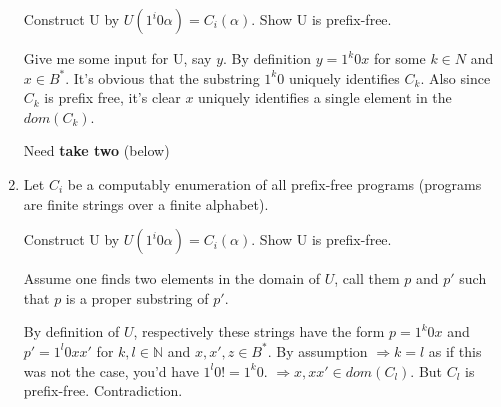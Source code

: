 \documentclass{article}
\newenvironment{answered}{\par\normalfont}{}
\begin{document}
\begin{enumerate}
	Construct U by $U(1^i0\alpha) = C_i(\alpha)$. Show U is prefix-free.

	\begin{answered}
		Give me some input for U, say $y$. By definition $y = 1^k0x$ for some $k \in N$ and $x \in B^*$. It's obvious that the substring $1^k0$ uniquely identifies $C_k$. Also since $C_k$ is prefix free, it's clear $x$ uniquely identifies a single element in the $dom(C_k)$.
	\end{answered}

	Need \textbf{take two} (below)

\item{Let $C_i$ be a computably enumeration of all prefix-free programs (programs are finite strings over a finite alphabet).}
	
	Construct U by $U(1^i0\alpha) = C_i(\alpha)$. Show U is prefix-free.

	\begin{answered}
		Assume one finds two elements in the domain of $U$, call them $p$ and $p'$ such that $p$ is a proper substring of $p'$.

		By definition of $U$, respectively these strings have the form $p = 1^k0x$ and $p' = 1^l0xx'$ for $k,l \in \mathbb{N}$ and $x,x',z \in B^*$. By assumption $\Rightarrow k = l$ as if this was not the case, you'd have $1^l0 != 1^k0$. $\Rightarrow x, xx' \in dom(C_{l})$. But $C_{l}$ is prefix-free. Contradiction.
	\end{answered}

\end{enumerate}
\end{document}

